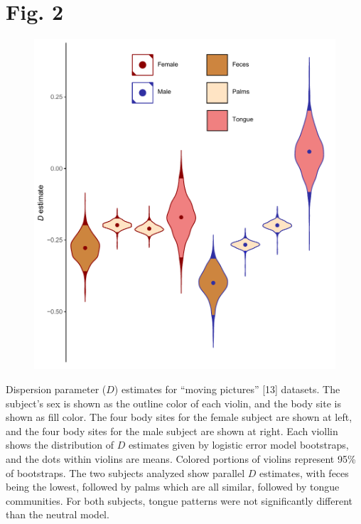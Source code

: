 \documentclass{article}
\begin{document}
\section*{Fig. 2}
\begin{figure}[ht]
	\centering
	\includegraphics[scale=0.80]{../Fig_2.pdf}
\end{figure}
Dispersion parameter (\(D\)) estimates for “moving pictures” [13] datasets. The subject’s sex is shown as the outline color of each violin, and the body site is shown as fill color. The four body sites for the female subject are shown at left, and the four body sites for the male subject are shown at right. Each viollin shows the distribution of \(D\) estimates given by logistic error model bootstraps, and the dots within violins are means. Colored portions of violins represent 95\% of bootstraps. The two subjects analyzed show parallel \(D\) estimates, with feces being the lowest, followed by palms which are all similar, followed by tongue communities. For both subjects, tongue patterns were not significantly different than the neutral model.
%
\newpage
%
%
\end{document}
